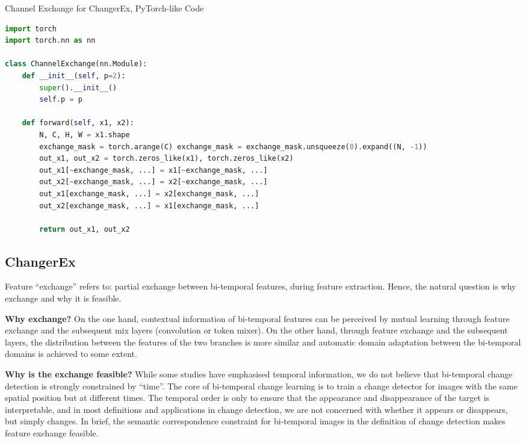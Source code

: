 \documentclass[10pt,twocolumn,letterpaper]{article}
\begin{document}
\begin{algorithm*}
\caption{Channel Exchange for ChangerEx, PyTorch-like Code}\label{alg:cap1}
\begin{algorithmic}
\State
\begin{lstlisting}[language=Python]
import torch
import torch.nn as nn

class ChannelExchange(nn.Module):
    def __init__(self, p=2):
        super().__init__()
        self.p = p

    def forward(self, x1, x2):
        N, C, H, W = x1.shape
        exchange_mask = torch.arange(C) exchange_mask = exchange_mask.unsqueeze(0).expand((N, -1))
        out_x1, out_x2 = torch.zeros_like(x1), torch.zeros_like(x2)
        out_x1[~exchange_mask, ...] = x1[~exchange_mask, ...]
        out_x2[~exchange_mask, ...] = x2[~exchange_mask, ...]
        out_x1[exchange_mask, ...] = x2[exchange_mask, ...]
        out_x2[exchange_mask, ...] = x1[exchange_mask, ...]
        
        return out_x1, out_x2
\end{lstlisting}
\end{algorithmic}
\end{algorithm*}



\subsection{ChangerEx}
Feature ``exchange'' refers to: partial exchange between bi-temporal features, during feature extraction. Hence, the natural question is why exchange and why it is feasible.

\textbf{Why exchange?} On the one hand, contextual information of bi-temporal features can be perceived by mutual learning through feature exchange and the subsequent mix layers (\eg convolution or token mixer). On the other hand, through feature exchange and the subsequent layers, the distribution between the features of the two branches is more similar and automatic domain adaptation between the bi-temporal domains is achieved to some extent.

\textbf{Why is the exchange feasible?} While some studies have emphasised temporal information, we do not believe that bi-temporal change detection is strongly constrained by ``time''. The core of bi-temporal change learning is to train a change detector for images with the same spatial position but at different times. The temporal order is only to ensure that the appearance and disappearance of the target is interpretable, and in most definitions and applications in change detection, we are not concerned with whether it appears or disappears, but simply changes. In brief, the semantic correspondence constraint for bi-temporal images in the definition of change detection makes feature exchange feasible.
\end{document}
